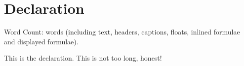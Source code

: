 \chapter*{Declaration}


Word Count: \wordcount{}words (including text, headers, captions, floats, inlined formulae and displayed formulae).


This is the declaration. This is not too long, honest!

\cleardoublepage{}
